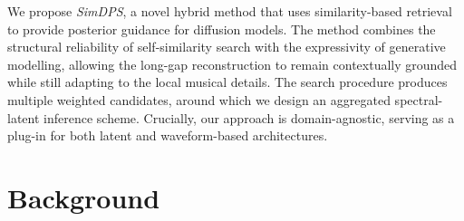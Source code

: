\documentclass{article}
\begin{document}


We propose \textit{SimDPS}, a novel hybrid method that uses similarity-based retrieval to provide posterior guidance for diffusion models.
The method combines the structural reliability of self-similarity search with the expressivity of generative modelling, allowing the long-gap reconstruction to remain contextually grounded while still adapting to the local musical details.
The search procedure produces multiple weighted candidates, around which we design an aggregated spectral-latent inference scheme.
Crucially, our approach is domain-agnostic, serving as a plug-in for both latent and waveform-based architectures.



















\vspace{-3pt}
\section{Background}
\vspace{-2pt}
\end{document}
